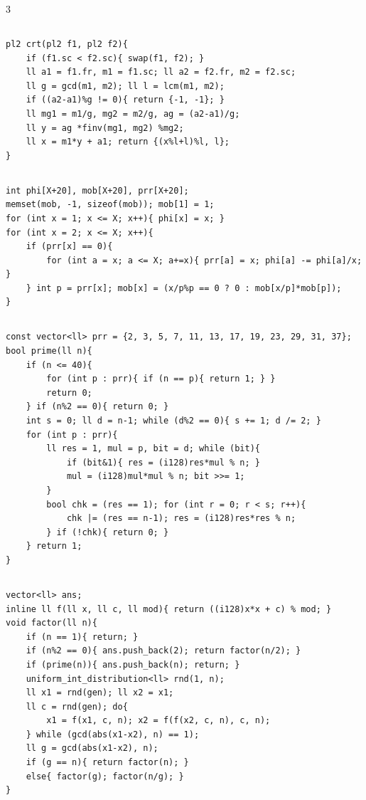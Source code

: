 \documentclass[landscape, 8pt, a4paper, oneside]{extarticle}
\begin{document}
\begin{multicols*}{3}
\subsection{}
\begin{verbatim}
pl2 crt(pl2 f1, pl2 f2){
	if (f1.sc < f2.sc){ swap(f1, f2); }
	ll a1 = f1.fr, m1 = f1.sc; ll a2 = f2.fr, m2 = f2.sc;
	ll g = gcd(m1, m2); ll l = lcm(m1, m2);
	if ((a2-a1)%g != 0){ return {-1, -1}; }
	ll mg1 = m1/g, mg2 = m2/g, ag = (a2-a1)/g;
	ll y = ag *finv(mg1, mg2) %mg2;
	ll x = m1*y + a1; return {(x%l+l)%l, l};
}
\end{verbatim}
\subsection{}
\begin{verbatim}
int phi[X+20], mob[X+20], prr[X+20];
memset(mob, -1, sizeof(mob)); mob[1] = 1;
for (int x = 1; x <= X; x++){ phi[x] = x; }
for (int x = 2; x <= X; x++){
	if (prr[x] == 0){
		for (int a = x; a <= X; a+=x){ prr[a] = x; phi[a] -= phi[a]/x; }
	} int p = prr[x]; mob[x] = (x/p%p == 0 ? 0 : mob[x/p]*mob[p]);
}
\end{verbatim}
\subsection{}
\begin{verbatim}
const vector<ll> prr = {2, 3, 5, 7, 11, 13, 17, 19, 23, 29, 31, 37};
bool prime(ll n){
	if (n <= 40){
		for (int p : prr){ if (n == p){ return 1; } }
		return 0;
	} if (n%2 == 0){ return 0; }
	int s = 0; ll d = n-1; while (d%2 == 0){ s += 1; d /= 2; }
	for (int p : prr){
		ll res = 1, mul = p, bit = d; while (bit){
			if (bit&1){ res = (i128)res*mul % n; }
			mul = (i128)mul*mul % n; bit >>= 1;
		}
		bool chk = (res == 1); for (int r = 0; r < s; r++){
			chk |= (res == n-1); res = (i128)res*res % n;
		} if (!chk){ return 0; }
	} return 1;
}
\end{verbatim}
\subsection{}
\begin{verbatim}
vector<ll> ans;
inline ll f(ll x, ll c, ll mod){ return ((i128)x*x + c) % mod; }
void factor(ll n){
	if (n == 1){ return; }
	if (n%2 == 0){ ans.push_back(2); return factor(n/2); }
	if (prime(n)){ ans.push_back(n); return; }
	uniform_int_distribution<ll> rnd(1, n);
	ll x1 = rnd(gen); ll x2 = x1;
	ll c = rnd(gen); do{
		x1 = f(x1, c, n); x2 = f(f(x2, c, n), c, n);
	} while (gcd(abs(x1-x2), n) == 1);
	ll g = gcd(abs(x1-x2), n);
	if (g == n){ return factor(n); }
	else{ factor(g); factor(n/g); }
}
\end{verbatim}

\end{multicols*}
\end{document}
